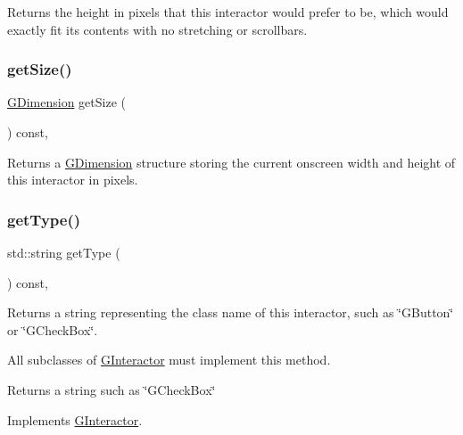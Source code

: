 Returns the height in pixels that this interactor would prefer to be, which would exactly fit its contents with no stretching or scrollbars. 

\mbox{\label{classGInteractor_a7b4eec96a2bdc6420695d5796a78eea9}} 
\subsubsection{\texorpdfstring{get\+Size()}{getSize()}}
{\footnotesize\ttfamily \mbox{\hyperlink{structGDimension}{G\+Dimension}} get\+Size (\begin{DoxyParamCaption}{ }\end{DoxyParamCaption}) const\hspace{0.3cm}{\ttfamily [virtual]}, {\ttfamily [inherited]}}



Returns a \mbox{\hyperlink{structGDimension}{G\+Dimension}} structure storing the current onscreen width and height of this interactor in pixels. 

\mbox{\label{classGScrollBar_a9b72ede4ee8520f987a0c01e30654814}} 
\subsubsection{\texorpdfstring{get\+Type()}{getType()}}
{\footnotesize\ttfamily std\+::string get\+Type (\begin{DoxyParamCaption}{ }\end{DoxyParamCaption}) const\hspace{0.3cm}{\ttfamily [override]}, {\ttfamily [virtual]}}



Returns a string representing the class name of this interactor, such as \char`\"{}\+G\+Button\char`\"{} or \char`\"{}\+G\+Check\+Box\char`\"{}. 

All subclasses of \mbox{\hyperlink{classGInteractor}{G\+Interactor}} must implement this method. \begin{DoxyReturn}{Returns}
a string such as \char`\"{}\+G\+Check\+Box\char`\"{} 
\end{DoxyReturn}


Implements \mbox{\hyperlink{classGInteractor_a44c407a54a20dd0f2fff30338289299d}{G\+Interactor}}.

